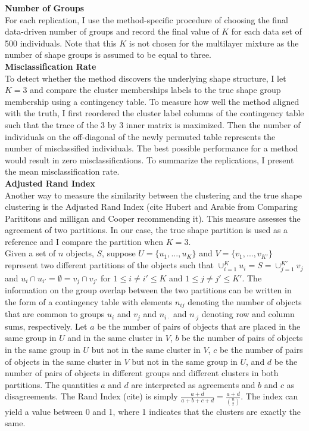 \documentclass[12pt]{article}
\begin{document}
\textbf{Number of Groups}\\
For each replication, I use the method-specific procedure of choosing the final data-driven number of groups and record the final value of $K$ for each data set of 500 individuals. Note that this $K$ is not chosen for the multilayer mixture as the number of shape groups is assumed to be equal to three.\\

\textbf{Misclassification Rate}\\
To detect whether the method discovers the underlying shape structure, I let $K=3$ and compare the cluster memberships labels to the true shape group membership using a contingency table. To measure how well the method aligned with the truth, I first reordered the cluster label columns of the contingency table such that the trace of the 3 by 3 inner matrix is maximized. Then the number of individuals on the off-diagonal of the newly permuted table represents the number of misclassified individuals. The best possible performance for a method would result in zero misclassifications. To summarize the replications, I present the mean misclassification rate.\\

\textbf{Adjusted Rand Index}\\
Another way to measure the similarity between  the clustering and the true shape clustering is the Adjusted Rand Index (cite Hubert and Arabie from Comparing Parititons and milligan and Cooper recommending it). This measure assesses the agreement of two partitions. In our case, the true shape partition is used as a reference and I compare the partition when $K=3$.\\
 
Given a set of $n$ objects, $S$, suppose $U = \{u_{1},...,u_{K}\}$ and $V=\{v_{1},...,v_{K'}\}$ represent two different partitions of the objects such that $\cup^{K}_{i=1}u_{i} = S = \cup^{K'}_{j=1}v_{j}$ and $u_{i}\cap u_{i'} = \emptyset = v_{j}\cap v_{j'}$ for $1\leq i\not=i'\leq K$ and $1\leq j\not= j'\leq K'$. The information on the group overlap between the two partitions can be written in the form of a contingency table with elements $n_{ij}$ denoting the number of objects that are common to groups $u_{i}$ and $v_{j}$ and $n_{i\cdot}$ and $n_{\cdot j}$ denoting row and column sums, respectively. Let $a$ be the number of pairs of objects that are placed in the same group in $U$ and in the same cluster in $V$, $b$ be the number of pairs of objects in the same group in $U$ but not in the same cluster in $V$, $c$ be the number of pairs of objects in the same cluster in $V$ but not in the same group in $U$, and $d$ be the number of pairs of objects in different groups and different clusters in both partitions. The quantities $a$ and $d$ are interpreted as agreements and $b$ and $c$ as disagreements. The Rand Index (cite) is simply $\frac{a+d}{a+b+c+d}=\frac{a+d}{{n \choose 2}}$.  The index can yield a value between 0 and 1, where 1 indicates that the clusters are exactly the same.\\
\end{document}

